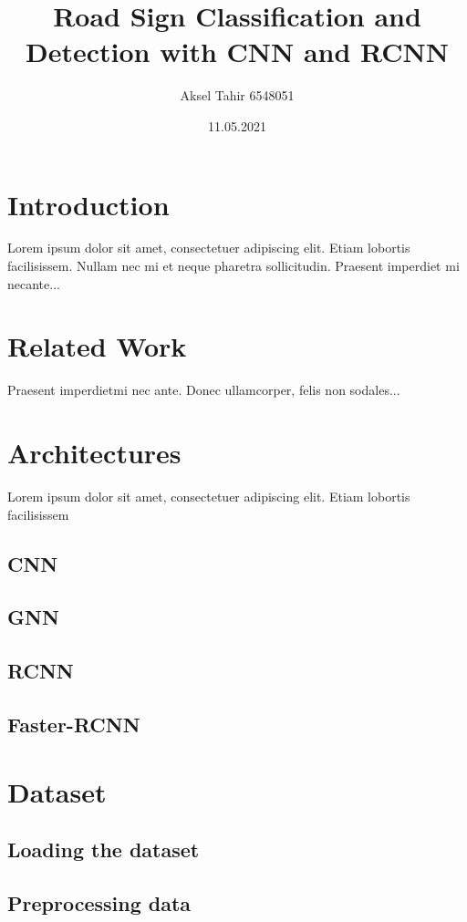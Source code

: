 \documentclass[12pt]{article}
\title{Road Sign Classification and Detection with CNN and RCNN}
\author{Aksel Tahir 6548051}
\date{11.05.2021}
\begin{document}
\maketitle

\tableofcontents

\section{Introduction}

Lorem ipsum dolor sit amet, consectetuer adipiscing elit.  
Etiam lobortis facilisissem.  Nullam nec mi et neque pharetra 
sollicitudin.  Praesent imperdiet mi necante...

\section{Related Work}
Praesent imperdietmi nec ante. Donec ullamcorper, felis non sodales...

\section{Architectures}
Lorem ipsum dolor sit amet, consectetuer adipiscing elit.  
Etiam lobortis facilisissem
\subsection{CNN}
\subsection{GNN}
\subsection{RCNN}
\subsection{Faster-RCNN}
    
\section{Dataset}
\subsection{Loading the dataset}
\subsection{Preprocessing data}
\end{document}
